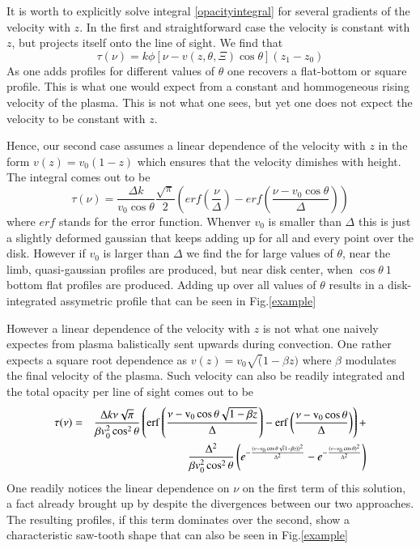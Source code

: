 \documentclass{/Users/art2/TeX/aanda/aa}
\begin{document}
It is worth to explicitly solve integral \ref{opacityintegral} for several gradients of the velocity with $z$.  In the first and straightforward case the 
velocity is constant with $z$, but projects itself onto the line of sight. We find that
\begin{equation}
   \tau(\nu)=k \phi[\nu-v(z,\theta,\Xi)\cos \theta](z_1-z_0)
\end{equation}
As one adds profiles for different values of $\theta$ one recovers a flat-bottom or square profile. This is what one would expect from a constant 
and hommogeneous rising velocity of the plasma. This is not what one sees, but yet one does not expect the velocity to be constant with $z$.

Hence, our second case assumes a linear dependence of the velocity with $z$ in the form $v(z)=v_0(1-z)$ which ensures that the velocity dimishes 
with height. The integral comes out to be
\begin{equation}
   \tau(\nu)=\frac{\Delta k}{v_0\cos\theta}\frac{\sqrt{\pi}}{2} \left( erf(\frac{\nu}{\Delta}) - erf(\frac{\nu-v_0\cos\theta}{\Delta}) \right)
\end{equation}
where $erf$ stands for the error function. Whenver $v_0$ is smaller than $\Delta$ this is just a slightly deformed gaussian that keeps adding 
up for all and every point over the disk. However if $v_0$ is larger than $\Delta$ we find the for large values of $\theta$, near the limb, quasi-gaussian 
profiles are produced, but near disk center, when $\cos \theta ~ 1$ bottom flat profiles are produced. Adding up over all values of $\theta$ results 
in a disk-integrated assymetric profile that can be seen in Fig.\ref{example}

However a linear dependence of the velocity with $z$ is not what one naively expectes from plasma balistically sent upwards during convection. One 
rather expects a square root dependence as $v(z)=v_0\sqrt(1-\beta z)$ where  $\beta$ modulates  the final velocity of the plasma. Such 
velocity can also be readily integrated and the total opacity per line of sight comes out to be
\begin{eqnarray}
   \tau(\nu)&=&\frac{\Delta k \nu \sqrt{\pi}}{\beta v_0^2\cos^2\theta} \left( \rm{erf}\left(\frac{\nu-v_0\cos \theta\sqrt{1-\beta z}}{\Delta}\right) - \rm{erf}\left(\frac{\nu-v_0\cos\theta}{\Delta}\right) \right)+\nonumber \\
   &&\frac{\Delta^2}{\beta v_0^2\cos^2\theta}\left(e^{-\frac{(\nu-v_0\cos\theta \sqrt(1-\beta z))^2}{\Delta^2}}-e^{-\frac{(\nu-v_0\cos\theta)^2}{\Delta^2}}\right)
\end{eqnarray}
One readily notices the linear dependence on $\nu$ on the first term of this solution, a fact already brought up by \cite{Bertout} despite the divergences 
between our two approaches. The resulting profiles, if this term dominates over the second, show a characteristic saw-tooth shape that 
can also be seen in Fig.\ref{example}
\end{document}
